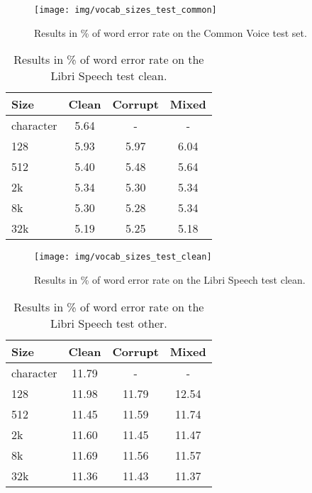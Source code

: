 \begin{figure}[p]
	\centering
	\texttt{[image: img/vocab\_sizes\_test\_common]}
	\caption{Results in \% of word error rate on the Common Voice test set.}
	\label{fig:vocab_sizes_common_graph}
\end{figure}


\begin{table}[p]
	\centering
	\begin{tabular}{l|ccc}
		\bf Size & \bf Clean & \bf Corrupt & \bf Mixed \\
		\hline
		
		character	&	5.64	&	-	&	- \\
		128	&	5.93	&	5.97	&	6.04 \\
		512	&	5.40	&	5.48	&	5.64 \\
		2k	&	5.34	&	5.30	&	5.34 \\
		8k	&	5.30	&	5.28	&	5.34 \\
		32k	&	5.19	&	5.25	&	5.18 \\
		
	\end{tabular}
	
	\caption{Results in \% of word error rate on the Libri Speech test clean.}
	\label{tab:results_vocabularies_libri_clean}
\end{table}

\begin{figure}[p]
	\centering
	\texttt{[image: img/vocab\_sizes\_test\_clean]}
	\caption{Results in \% of word error rate on the Libri Speech test clean.}
	\label{fig:vocab_sizes_test_clean}
\end{figure}

\begin{table}[p]
	\centering
	\begin{tabular}{l|ccc}
		\bf Size & \bf Clean & \bf Corrupt & \bf Mixed \\
		\hline
		character	&	11.79	&	-	&	- \\
		128	&	11.98	&	11.79	&	12.54\\
		512	&	11.45	&	11.59	&	11.74\\
		2k	&	11.60	&	11.45	&	11.47\\
		8k	&	11.69	&	11.56	&	11.57\\
		32k	&	11.36	&	11.43	&	11.37\\
		
	\end{tabular}
	
	\caption{Results in \% of word error rate on the Libri Speech test other.}
	\label{tab:results_vocabularies_libri_other}
\end{table}

